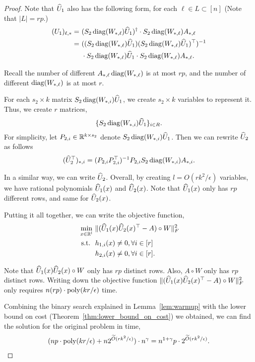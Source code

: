 \begin{proof}
Note that $\widehat{U}_1$ also has the following form, for each $\ell \in L \subset [n]$ (Note that $|L| = r p$.)
\begin{align*}
(U_1)_{\ell, *} 
= & ~  ( S_2 \operatorname{diag}( W_{*,\ell} ) \widehat{U}_1 )^\dagger \cdot S_2 \operatorname{diag}(W_{*,\ell})  A_{*,\ell} \\
= & ~ (  ( S_2 \operatorname{diag}( W_{*,\ell} ) \widehat{U}_1 ) ( S_2 \operatorname{diag}( W_{*,\ell} ) \widehat{U}_1)^\top )^{-1} \\
& ~ \cdot S_2 \operatorname{diag}( W_{*,\ell} ) \widehat{U}_1 \cdot S_2 \operatorname{diag}(W_{*,\ell})  A_{*,\ell}.
\end{align*}

Recall the number of different $A_{*,\ell} \operatorname{diag}(W_{*,\ell})$ is at most $rp$, and the number of different $ \operatorname{diag}(W_{*,\ell})$ is at most $r$.

For each $s_2 \times k$ matrix $S_2 \operatorname{diag}( W_{*,i} ) \widehat{U}_1$, we create $s_2 \times k$ variables to represent it. Thus, we create $r$ matrices,
\begin{align*}
\{ S_2 \operatorname{diag}( W_{*,i} ) \widehat{U}_1 \}_{i \in R}.
\end{align*}
For simplicity, let $P_{2,i} \in \mathbb{R}^{k \times s_2}$ denote $S_2 \operatorname{diag}( W_{*,i} ) \widehat{U}_1$. Then we can rewrite $\widehat{U}_2$ as follows
\begin{align*}
    (\widehat{U}_2^\top)_{*,i} = (P_{2,i} P_{2,i}^\top)^{-1}  P_{2,i} S_2 \operatorname{diag}(W_{*,i})  A_{*,i}.
\end{align*}

In a similar way, we can write $\widehat{U}_2$. Overall, by creating $l = O(rk^2/\epsilon)$ variables, we have rational polynomials $\widehat{U}_1(x)$ and $\widehat{U}_2(x)$. Note that $\widehat{U}_1(x)$ only has $rp$ different rows, and same for $\widehat{U}_2(x)$.

Putting it all together, we can write the objective function,
\begin{align*}
\min_{x \in \mathbb{R}^l} & ~ \| ( \widehat{U}_1(x) \widehat{U}_2(x)^\top - A ) \circ W \|_F^2 \\
\mathrm{~s.t.~}& ~ h_{1,i}(x) \neq 0 ,  \forall i \in [r] \\
& ~ h_{2,i}(x) \neq 0, \forall i \in [r].
\end{align*}

Note that $\widehat{U}_1(x) \widehat{U}_{2}(x) \circ W$ only has $rp$ distinct rows. Also, $A \circ W$ only has $rp$ distinct rows. Writing down the objective function $\| ( \widehat{U}_1(x) \widehat{U}_2(x)^\top - A ) \circ W \|_F^2$ only requires $n (rp) \cdot \operatorname{poly}(kr/\epsilon)$ time.

Combining the binary search explained in Lemma~\ref{lem:warmup} 
with the lower bound on cost (Theorem~\ref{thm:lower_bound_on_cost}) we obtained, we can find the solution for the original problem in time,
\begin{align*}
(np \cdot \operatorname{poly}(kr/\epsilon) + n 2^{\widetilde{O} (rk^2 / \epsilon) }  ) \cdot n^{\gamma} = n^{1+\gamma} p \cdot 2^{\widetilde{O}(rk^2/\epsilon)}.
\end{align*}

\end{proof}